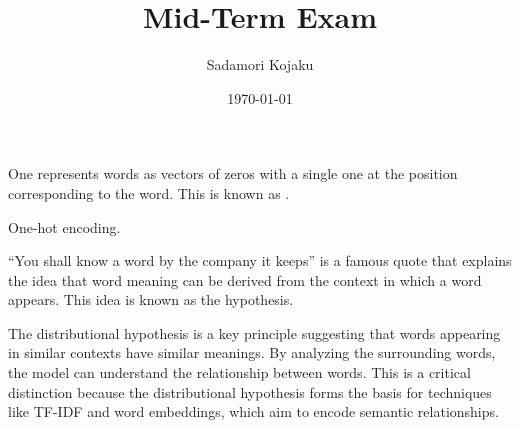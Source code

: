 \documentclass[11pt,addpoints,answers]{exam}
\title{Mid-Term Exam}
\author{Sadamori Kojaku}
\date{\today}
\begin{document}
\pagestyle{head}

\begin{center}
\end{center}

\vspace{0.2in}


\begin{questions}

\question[1] One represents words as vectors of zeros with a single one at the position corresponding to the word.
This is known as .
\begin{solution}
One-hot encoding.
\end{solution}

\question[1] ``You shall know a word by the company it keeps'' is a famous quote that explains the idea that word meaning can be derived from the context in which a word appears. This idea is known as the \fillin[distributional] hypothesis.
\begin{solution}
The distributional hypothesis is a key principle suggesting that words appearing in similar contexts have similar meanings. By analyzing the surrounding words, the model can understand the relationship between words. This is a critical distinction because the distributional hypothesis forms the basis for techniques like TF-IDF and word embeddings, which aim to encode semantic relationships.
\end{solution}



\end{questions}
\end{document}
